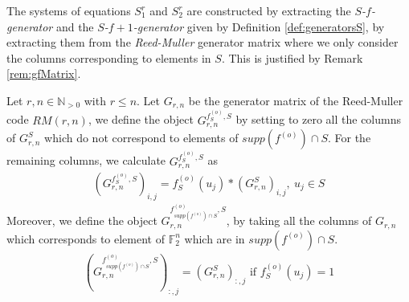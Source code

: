 \documentclass[11pt]{llncs}
\begin{document}
The systems of equations $S_1^r$ and $S_2^r$ are constructed by extracting the \textit{$S$-$f$-generator} and the \textit{$S$-$f+1$-generator} given by Definition \ref{def:generatorsS}, by extracting them from the \textit{Reed-Muller} generator matrix where we only consider the columns corresponding to elements in $S$. This is justified by Remark \ref{rem:gfMatrix}.





\begin{definition}\label{def:generatorsS}
Let $r,n\in\mathbb{N}_{>0}$ with $r\leq n$. Let $G_{r,n}$ be the generator matrix of the Reed-Muller code $RM(r,n)$, we define the object $G_{r,n}^{f^{(o)}_S,S}$ by setting to zero all the columns of $G_{r,n}^S$ which do not correspond to elements of $supp(f^{(o)} )\cap S$. For the remaining columns, we calculate $G_{r,n}^{f_S^{(o)},S}$ as
	\begin{align*}
	\left(G_{r,n}^{f^{(o)}_S,S}\right)_{i,j} = f_S^{(o)}(u_j)*\left(G_{r,n}^S\right)_{i,j}, \ u_j \in S
	\end{align*}
	Moreover, we define the object $G_{r,n}^{f^{(o)}_{supp\left(f^{(o)}\right) \cap S},S}$, by taking all the columns of $G_{r,n}$ which corresponds to element of $\mathbb{F}_2^n$ which are in $supp\left(f^{(o)}\right) \cap S$.
	\begin{align}
	\left(G_{r,n}^{f_{supp\left(f^{(o)}\right) \cap S}^{(o)},S}\right)_{:,j} = (G_{r,n}^S)_{:,j} \mbox{ if } f_S^{(o)}(u_j) = 1 \label{eq:f-generatorRestrictedSet}
	\end{align}
\end{definition}


\end{document}

